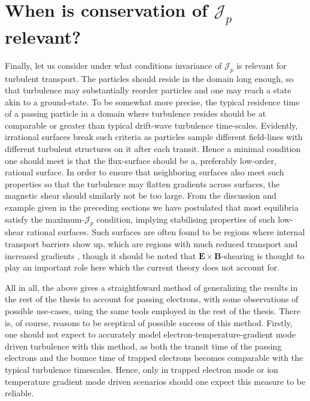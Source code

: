 \section{When is conservation of $\mathcal{J}_p$ relevant?}
Finally, let us consider under what conditions invariance of $\mathcal{J}_p$ is relevant for turbulent transport. The particles should reside in the domain long enough, so that turbulence may substantially reorder particles and one may reach a state akin to a ground-state. To be somewhat more precise, the typical residence time of a passing particle in a domain where turbulence resides should be at comparable or greater than typical drift-wave turbulence time-scales. Evidently, irrational surfaces break such criteria as particles sample different field-lines with different turbulent structures on it after each transit. Hence a minimal condition one should meet is that the flux-surface should be a, preferably low-order, rational surface. In order to ensure that neighboring surfaces also meet such properties so that the turbulence may flatten gradients across surfaces, the magnetic shear should similarly not be too large. From the discussion and example given in the preceding sections we have postulated that most equilibria satisfy the maximum-$\mathcal{J}_p$ condition, implying stabilising properties of such low-shear rational surfaces. Such surfaces are often found to be regions where internal transport barriers show up, which are regions with much reduced transport and increased gradients \cite{fujita1997internal,turri2008role,ida2018internal}, though it should be noted that $\boldsymbol{E} \times \boldsymbol{B}$-shearing is thought to play an important role here which the current theory does not account for. \par 
All in all, the above gives a straightfoward method of generalizing the results in the rest of the thesis to account for passing electrons, with some observations of possible use-cases, using the same tools employed in the rest of the thesis. There is, of course, reasons to be sceptical of possible success of this method. Firstly, one should not expect to accurately model electron-temperature-gradient mode driven turbulence with this method, as both the transit time of the passing electrons and the bounce time of trapped electrons becomes comparable with the typical turbulence timescales. Hence, only in trapped electron mode or ion temperature gradient mode driven scenarios should one expect this measure to be reliable.

